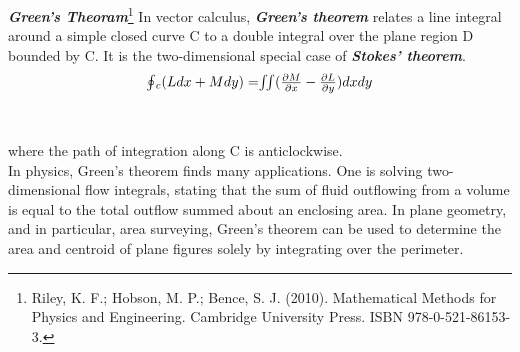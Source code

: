  \textbf{\textit{Green's Theoram}}\footnote{ Riley, K. F.; Hobson, M. P.; Bence, S. J. (2010). Mathematical Methods for Physics and Engineering. Cambridge University Press. ISBN 978-0-521-86153-3.}
In vector calculus, \textbf{\textit{Green's theorem}} relates a line integral around a simple closed curve C to a double integral over the plane region D bounded by C. It is the two-dimensional special case of \textbf{\textit{Stokes' theorem}}.\\
\begin{equation}
$$\oint$$_c(L dx + M dy)= $$\iint$$ (\frac{\partial M}{\partial x} - \frac{\partial L}{\partial y})dx dy
\end{equation}\\
\\where the path of integration along C is anticlockwise.\\
In physics, Green's theorem finds many applications. One is solving two-dimensional flow integrals, stating that the sum of fluid outflowing from a volume is equal to the total outflow summed about an enclosing area. In plane geometry, and in particular, area surveying, Green's theorem can be used to determine the area and centroid of plane figures solely by integrating over the perimeter.


